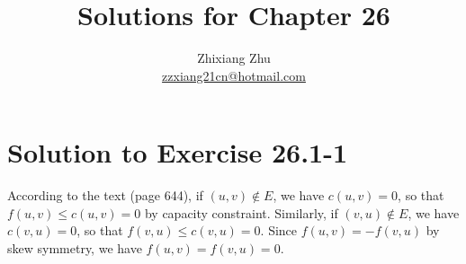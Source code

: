 \documentclass[a4paper, fleqn]{article}
\title{Solutions for Chapter 26}
\author{Zhixiang Zhu  \\\href{mailto:zzxiang21cn@hotmail.com}{zzxiang21cn@hotmail.com}}
\begin{document}
\maketitle

\section*{Solution to Exercise 26.1-1}

According to the text (page 644), if $(u, v) \notin E$, we have $c(u, v) = 0$, so that $f(u, v) \leq c(u, v) = 0$ by capacity constraint. Similarly, if $(v, u) \notin E$, we have $c(v, u) = 0$, so that $f(v, u) \leq c(v, u) = 0$. Since $f(u, v) = -f(v, u)$ by skew symmetry, we have $f(u, v) = f(v, u) = 0$.
\end{document}
